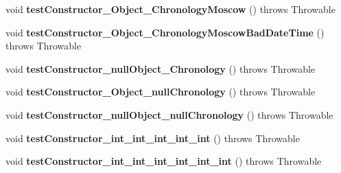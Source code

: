 \begin{DoxyCompactItemize}
\item 
\hypertarget{classorg_1_1joda_1_1time_1_1_test_local_date_time___constructors_a15f8fe07fab16627b006c62986af62b3}{void {\bfseries test\-Constructor\-\_\-\-Object\-\_\-\-Chronology\-Moscow} ()  throws Throwable }\label{classorg_1_1joda_1_1time_1_1_test_local_date_time___constructors_a15f8fe07fab16627b006c62986af62b3}

\item 
\hypertarget{classorg_1_1joda_1_1time_1_1_test_local_date_time___constructors_a0cc9e8276c5255246e2ed3eab6fca75e}{void {\bfseries test\-Constructor\-\_\-\-Object\-\_\-\-Chronology\-Moscow\-Bad\-Date\-Time} ()  throws Throwable }\label{classorg_1_1joda_1_1time_1_1_test_local_date_time___constructors_a0cc9e8276c5255246e2ed3eab6fca75e}

\item 
\hypertarget{classorg_1_1joda_1_1time_1_1_test_local_date_time___constructors_a0b214d1a97b0caca7902d31ef7aa283b}{void {\bfseries test\-Constructor\-\_\-null\-Object\-\_\-\-Chronology} ()  throws Throwable }\label{classorg_1_1joda_1_1time_1_1_test_local_date_time___constructors_a0b214d1a97b0caca7902d31ef7aa283b}

\item 
\hypertarget{classorg_1_1joda_1_1time_1_1_test_local_date_time___constructors_a58fbc2f716fe7cf9e6cc1d49910f5a6d}{void {\bfseries test\-Constructor\-\_\-\-Object\-\_\-null\-Chronology} ()  throws Throwable }\label{classorg_1_1joda_1_1time_1_1_test_local_date_time___constructors_a58fbc2f716fe7cf9e6cc1d49910f5a6d}

\item 
\hypertarget{classorg_1_1joda_1_1time_1_1_test_local_date_time___constructors_a935c367466e87ba4a5c8eaf25605972e}{void {\bfseries test\-Constructor\-\_\-null\-Object\-\_\-null\-Chronology} ()  throws Throwable }\label{classorg_1_1joda_1_1time_1_1_test_local_date_time___constructors_a935c367466e87ba4a5c8eaf25605972e}

\item 
\hypertarget{classorg_1_1joda_1_1time_1_1_test_local_date_time___constructors_a3f4cba173b2a533546d07a7979a423b8}{void {\bfseries test\-Constructor\-\_\-int\-\_\-int\-\_\-int\-\_\-int\-\_\-int} ()  throws Throwable }\label{classorg_1_1joda_1_1time_1_1_test_local_date_time___constructors_a3f4cba173b2a533546d07a7979a423b8}

\item 
\hypertarget{classorg_1_1joda_1_1time_1_1_test_local_date_time___constructors_a6eb102f3a0fb4ec01f03fd4daa3c413d}{void {\bfseries test\-Constructor\-\_\-int\-\_\-int\-\_\-int\-\_\-int\-\_\-int\-\_\-int} ()  throws Throwable }\label{classorg_1_1joda_1_1time_1_1_test_local_date_time___constructors_a6eb102f3a0fb4ec01f03fd4daa3c413d}


\end{DoxyCompactItemize}
